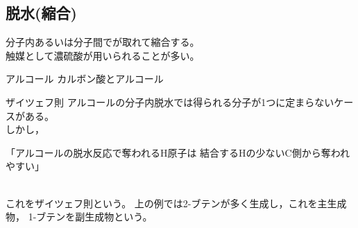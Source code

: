 \subsection{脱水(縮合)}
\begin{screen}
  \centerline{
    分子内あるいは分子間でが取れて縮合する。 \\
    触媒として濃硫酸が用いられることが多い。
  }
\end{screen}
アルコール
カルボン酸とアルコール

\begin{itembox}[l]{ザイツェフ則}
  アルコールの分子内脱水では得られる分子が1つに定まらないケースがある。\\
  しかし，\\
  \centerline{「アルコールの脱水反応で奪われる{H}原子は
  結合する{H}の少ない{C}側から奪われやすい」}\\
  これをザイツェフ則という。
  上の例では2-ブテンが多く生成し，これを主生成物，
  1-ブテンを副生成物という。
\end{itembox}

